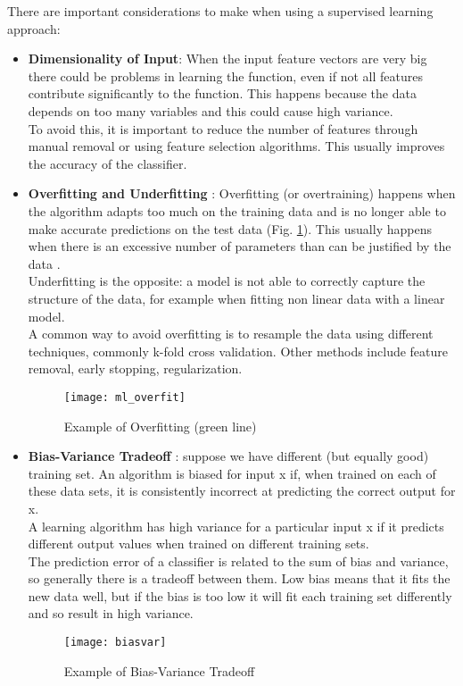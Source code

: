 There are important considerations to make when using a supervised learning approach:
\begin{itemize}
	\item \textbf{Dimensionality of Input}: When the input feature vectors are very big there could be problems in learning the function, even if not all features contribute significantly to the function. This happens because the data depends on too many variables and this could cause high variance. \\
	To avoid this, it is important to reduce the number of features through manual removal or using feature selection algorithms. This usually improves the accuracy of the classifier.
	\item \textbf{Overfitting and Underfitting} \cite{overfit}: Overfitting (or overtraining) happens when the algorithm adapts too much on the training data and is no longer able to make accurate predictions on the test data (Fig. \ref{fig:ml_overfit}). This usually happens when there is an excessive number of parameters than can be justified by the data \cite{camb_over}. \\
	Underfitting is the opposite: a model is not able to correctly capture the structure of the data, for example when fitting non linear data with a linear model.\\
	A common way to avoid overfitting is to resample the data using different techniques, commonly k-fold cross validation. Other methods include feature removal, early stopping, regularization.
	
	\begin{figure}[H]
		\centering
		\texttt{[image: ml\_overfit]}
		\caption{Example of Overfitting (green line) \cite{wiki:ml_overfit}}
		\label{fig:ml_overfit}
	\end{figure}	
	
	\item \textbf{Bias-Variance Tradeoff} \cite{biasvar}: suppose we have different (but equally good) training set. An algorithm is biased for input x if, when trained on each of these data sets, it is consistently incorrect at predicting the correct output for x. \\
	A learning algorithm has high variance for a particular input x if it predicts different output values when trained on different training sets. \\
	The prediction error of a classifier is related to the sum of bias and variance, so generally there is a tradeoff between them. Low bias means that it fits the new data well, but if the bias is too low it will fit each training set differently and so result in high variance.
	\begin{figure}[H]
		\centering
		\texttt{[image: biasvar]}
		\caption{Example of Bias-Variance Tradeoff \cite{biasvar}}
		\label{fig:biasvar}
	\end{figure}	
\end{itemize}

